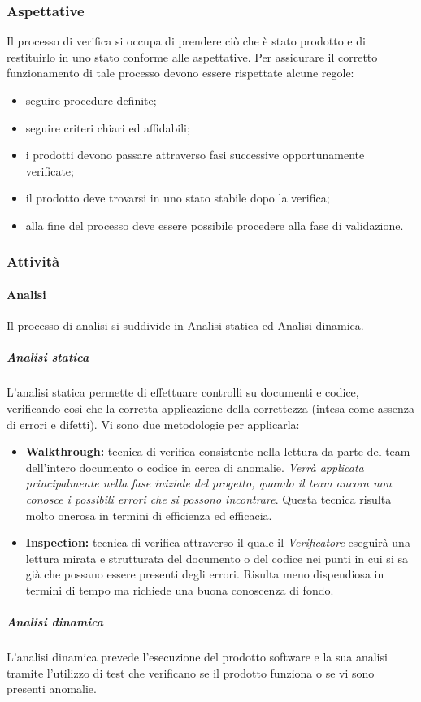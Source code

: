 \subsubsection{Aspettative}
Il processo di verifica si occupa di prendere ciò che è stato prodotto e di restituirlo in uno stato conforme alle aspettative. Per assicurare il corretto funzionamento di tale processo devono essere rispettate alcune regole:
\begin{itemize}
	\item seguire procedure definite;
	\item seguire criteri chiari ed affidabili;
	\item i prodotti devono passare attraverso fasi successive opportunamente verificate;
	\item il prodotto deve trovarsi in uno stato stabile dopo la verifica;
	\item alla fine del processo deve essere possibile procedere alla fase di validazione.
\end{itemize}
\subsubsection{Attività}
\paragraph{Analisi}
\label{Analisi}
Il processo di analisi si suddivide in Analisi statica ed Analisi dinamica.
\subparagraph{Analisi statica}
L'analisi statica permette di effettuare controlli su documenti e codice, verificando così che la corretta applicazione della correttezza (intesa come assenza di errori e difetti). Vi sono due metodologie per applicarla:
\begin{itemize}
	\item \textbf{Walkthrough:} tecnica di verifica consistente nella lettura da parte del team dell'intero documento o codice in cerca di anomalie. \textit{Verrà applicata principalmente nella fase iniziale del progetto, quando il team ancora non conosce i possibili errori che si possono incontrare}. Questa tecnica risulta molto onerosa in termini di efficienza ed efficacia.
	\item \textbf{Inspection:} tecnica di verifica attraverso il quale il \textit{Verificatore} eseguirà una lettura mirata e strutturata del documento o del codice nei punti in cui si sa già che possano essere presenti degli errori. Risulta meno dispendiosa in termini di tempo ma richiede una buona conoscenza di fondo.
\end{itemize}
\subparagraph{Analisi dinamica}
L'analisi dinamica prevede l'esecuzione del prodotto software e la sua analisi tramite l'utilizzo di test che verificano se il prodotto funziona o se vi sono presenti anomalie.
